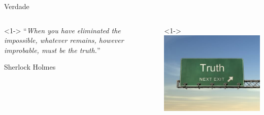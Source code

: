 \documentclass{beamer}
\begin{document}

\begin{frame}{Verdade}
  \begin{columns}
    \begin{column}{6cm}<1-> \footnotesize
      ``{\em When you have eliminated the impossible, whatever remains, however improbable, must be the truth.}''

      \hfill{Sherlock Holmes}
    \end{column}
    \begin{column}{4cm}<1->
      \includegraphics[height=0.4\textheight]{Intro/truth}
    \end{column}
  \end{columns}
\end{frame}


\end{document}
